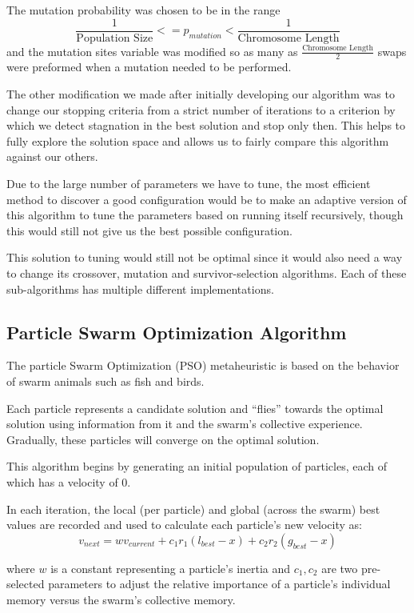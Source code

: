 \documentclass[a4paper]{article}
\begin{document}
The mutation probability was chosen to be in the range $$\frac{1}{\text{Population Size}} <= p_\mathit{mutation} < \frac{1}{\text{Chromosome Length}}$$ and the mutation sites variable was modified so as many as $\frac{\text{Chromosome Length}}{2}$ swaps were preformed when a mutation needed to be performed.

The other modification we made after initially developing our algorithm was to change our stopping criteria from a strict number of iterations to a criterion by which we detect stagnation in the best solution and stop only then. This helps to fully explore the solution space and allows us to fairly compare this algorithm against our others.

Due to the large number of parameters we have to tune, the most efficient method to discover a good configuration would be to make an adaptive version of this algorithm to tune the parameters based on running itself recursively, though this would still not give us the best possible configuration.

This solution to tuning would still not be optimal since it would also need a way to change its crossover, mutation and survivor-selection algorithms. Each of these sub-algorithms has multiple different implementations.

\subsection{Particle Swarm Optimization Algorithm}
The particle Swarm Optimization (PSO) metaheuristic is based on the behavior of swarm animals such as fish and birds.

Each particle represents a candidate solution and ``flies'' towards the optimal solution using information from it and the swarm's collective experience. Gradually, these particles will converge on the optimal solution.

This algorithm begins by generating an initial population of particles, each of which has a velocity of 0.

In each iteration, the local (per particle) and global (across the swarm) best values are recorded and used to calculate each particle's new velocity \cite{ClassicalPSO} as:
$$
v_\mathit{next} = wv_\mathit{current} + c_1r_1(l_\mathit{best} - x) + c_2r_2(g_\mathit{best}-x)
$$

where $w$ is a constant representing a particle's inertia and $c_1, c_2$ are two pre-selected parameters to adjust the relative importance of a particle's individual memory versus the swarm's collective memory. 
\end{document}
